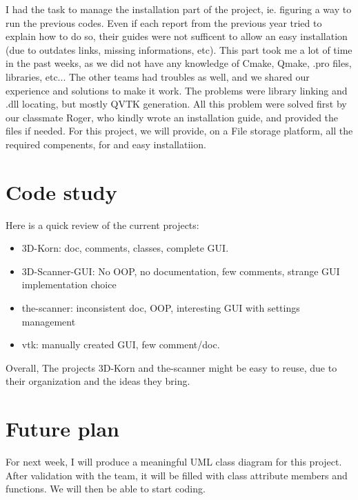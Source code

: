 \documentclass[aps,letterpaper,11pt]{revtex4}
\begin{document}
I had the task to manage  the installation part of the project, ie. figuring a way to run the previous codes. Even if each report from the previous year tried to explain how to do so, their guides were not sufficent to allow an easy installation (due to outdates links, missing informations, etc). This part took me a lot of time in the past weeks, as we did not have any knowledge of Cmake, Qmake, .pro files, libraries, etc... The other teams had troubles as well, and we shared our experience and solutions to make it work. The problems were library linking and .dll locating, but mostly QVTK generation. All this problem were solved first by our classmate Roger, who kindly wrote an installation guide, and provided the files if needed.
For this project, we will provide, on a File storage platform, all the required compenents, for and easy installatiion.

\section{Code study}

Here is a quick review of the current projects:

\begin{itemize}
\item 3D-Korn: doc, comments, classes, complete GUI.
\item 3D-Scanner-GUI: No OOP, no documentation, few comments, strange GUI implementation choice
\item the-scanner: inconsistent doc, OOP, interesting GUI with settings management
\item vtk: manually created GUI, few comment/doc.
\end{itemize}

Overall, The projects 3D-Korn and the-scanner might be easy to reuse, due to their organization and the ideas they bring.


\section{Future plan}

For next week, I will produce a meaningful UML class diagram for this project. After validation with the team, it will be filled with class attribute members and functions. We will then be able to start coding.
\end{document}
